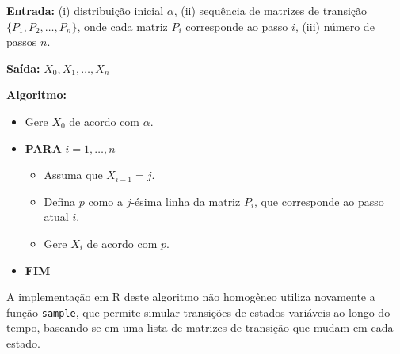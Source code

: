 \documentclass[12pt, a4paper, openany]{book}
\numberwithin{equation}{chapter}
\numberwithin{table}{chapter}
\numberwithin{figure}{chapter}
\theoremstyle{break}
\begin{document}
\textbf{Entrada:} (i) distribuição inicial \( \alpha \), (ii) sequência de matrizes de transição \( \{ P_1, P_2, \dots, P_n \} \), onde cada matriz \( P_i \) corresponde ao passo \( i \), (iii) número de passos \( n \).

\textbf{Saída:} \( X_0, X_1, \dots, X_n \)

\textbf{Algoritmo:}
\begin{itemize}
    \item Gere \( X_0 \) de acordo com \( \alpha \).
    \item \textbf{PARA} \( i = 1, \dots, n \)
    \begin{itemize}
        \item Assuma que \( X_{i-1} = j \).
        \item Defina \( p \) como a \( j \)-ésima linha da matriz \( P_i \), que corresponde ao passo atual \( i \).
        \item Gere \( X_i \) de acordo com \( p \).
    \end{itemize}
    \item \textbf{FIM}
\end{itemize}

A implementação em R deste algoritmo não homogêneo utiliza novamente a função \texttt{sample}, que permite simular transições de estados variáveis ao longo do tempo, baseando-se em uma lista de matrizes de transição que mudam em cada estado. 
\end{document}
